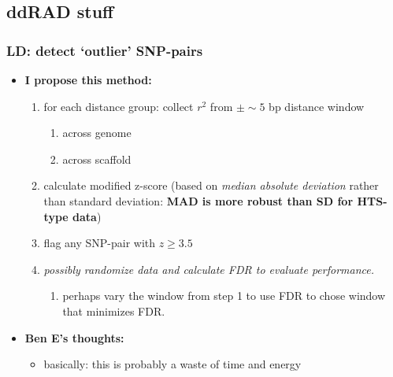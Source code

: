 \documentclass[letterpaper]{scrartcl}
\begin{document}
\subsection{ddRAD stuff}\label{ddrad-stuff}

\subsubsection{LD: detect `outlier'
SNP-pairs}\label{ld-detect-outlier-snp-pairs}

\begin{itemize}
\itemsep1pt\parskip0pt
\item
  \textbf{I propose this method:}

  \begin{enumerate}
  \def\labelenumi{\arabic{enumi}.}
  \itemsep1pt\parskip0pt
  \item
    for each distance group: collect \(r^2\) from \(\pm \sim5\) bp
    distance window

    \begin{enumerate}
    \def\labelenumii{\alph{enumii}.}
    \itemsep1pt\parskip0pt
    \item
      across genome
    \item
      across scaffold
    \end{enumerate}
  \item
    calculate modified z-score (based on \emph{median absolute
    deviation} rather than standard deviation: \textbf{MAD is more
    robust than SD for HTS-type data})
  \item
    flag any SNP-pair with \(z \geq 3.5\)
  \item
    \emph{possibly randomize data and calculate FDR to evaluate
    performance.}

    \begin{enumerate}
    \def\labelenumii{\alph{enumii}.}
    \itemsep1pt\parskip0pt
    \item
      perhaps vary the window from step 1 to use FDR to chose window
      that minimizes FDR.
    \end{enumerate}
  \end{enumerate}
\item
  \textbf{Ben E's thoughts:}

  \begin{itemize}
  \itemsep1pt\parskip0pt
  \item
    basically: this is probably a waste of time and energy


\end{itemize}
\end{itemize}
\end{document}
